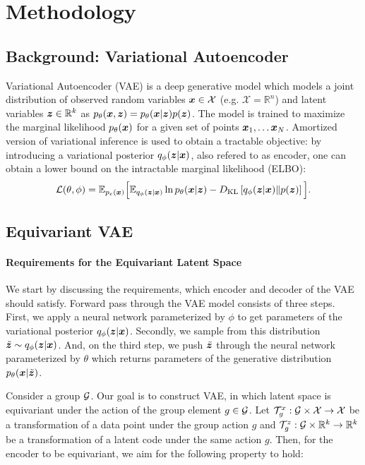 \section{Methodology}


\subsection{Background: Variational Autoencoder}\label{sec:vae}
Variational Autoencoder (VAE) \citep{kingma2014autoencoding, rezende2014stochastic} is a deep generative model which models a joint distribution of observed random variables ${\bm{x}} \in \mathcal{X}$ (e.g. $\mathcal{X} = \mathbb{R}^n$) and latent variables ${\bm{z}} \in \mathbb{R}^k$ as $p_{\theta}({\bm{x}}, {\bm{z}}) = p_{\theta}({\bm{x}}|{\bm{z}})p({\bm{z}})$. The model is trained to maximize the marginal likelihood $p_{\theta}({\bm{x}})$ for a given set of points ${\bm{x}}_1, \dots {\bm{x}}_N$. Amortized version of variational inference \citep{jordan1999introduction} is used to obtain a tractable objective: by introducing a variational posterior $q_{\phi}({\bm{z}}|{\bm{x}})$, also refered to as encoder, one can obtain a lower bound on the intractable marginal likelihood (ELBO):
\begin{equation} \label{eq_ch2:elbo}
    \mathcal{L}(\theta, \phi) = \E_{p_e(\vx)}\Big[\E_{q_{\phi}(\vz|\vx)} \ln p_{\theta}(\vx|\vz) -\KL{q_{\phi}(\vz|\vx) }{p(\vz)} \Big]. 
\end{equation}

\subsection{Equivariant VAE}\label{sec:eq_vae}
\paragraph{Requirements for the Equivariant Latent Space} We start by discussing the requirements, which encoder and decoder of the VAE should satisfy. Forward pass through the VAE model consists of three steps. First, we apply a neural network parameterized by $\phi$ to get parameters of the variational posterior $q_{\phi}({\bm{z}}|{\bm{x}})$. Secondly, we sample from this distribution $\tilde{{\bm{z}}} \sim q_{\phi}({\bm{z}}|{\bm{x}})$. And, on the third step, we push $\tilde{{\bm{z}}}$ through the neural network parameterized by $\theta$ which returns parameters of the generative distribution $p_{\theta}({\bm{x}}|\tilde{{\bm{z}}})$. 

Consider a group ${\mathcal{G}}$. Our goal is to construct VAE, in which latent space is equivariant under the action of the group element $g \in {\mathcal{G}}$. Let ${\mathcal{T}}_g^x: {\mathcal{G}} \times \mathcal{X} \rightarrow \mathcal{X}$ be a transformation of a data point under the group action $g$ and ${\mathcal{T}}_g^z: {\mathcal{G}} \times \mathbb{R}^k \rightarrow \mathbb{R}^k$ be a transformation of a latent code under the same action $g$. Then, for the encoder to be equivariant, we aim for the following property to hold:

